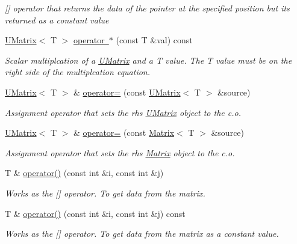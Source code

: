 \begin{DoxyCompactItemize}
\begin{DoxyCompactList}\small\item\em \mbox{[}\mbox{]} operator that returns the data of the pointer at the specified position but its returned as a constant value \end{DoxyCompactList}\item 
\mbox{\hyperlink{class_u_matrix}{U\+Matrix}}$<$ T $>$ \mbox{\hyperlink{class_u_matrix_a7b1875cfc49b374875dac2a58948f3ac}{operator $\ast$}} (const T \&val) const
\begin{DoxyCompactList}\small\item\em Scalar multiplcation of a \mbox{\hyperlink{class_u_matrix}{U\+Matrix}} and a T value. The T value must be on the right side of the multiplcation equation. \end{DoxyCompactList}\item 
\mbox{\hyperlink{class_u_matrix}{U\+Matrix}}$<$ T $>$ \& \mbox{\hyperlink{class_u_matrix_a3f12f4544a460dd93dac8a883654310f}{operator=}} (const \mbox{\hyperlink{class_u_matrix}{U\+Matrix}}$<$ T $>$ \&source)
\begin{DoxyCompactList}\small\item\em Assignment operator that sets the rhs \mbox{\hyperlink{class_u_matrix}{U\+Matrix}} object to the c.\+o. \end{DoxyCompactList}\item 
\mbox{\hyperlink{class_u_matrix}{U\+Matrix}}$<$ T $>$ \& \mbox{\hyperlink{class_u_matrix_a98d77665ae6c6dd8c264d7aca57d76fd}{operator=}} (const \mbox{\hyperlink{class_matrix}{Matrix}}$<$ T $>$ \&source)
\begin{DoxyCompactList}\small\item\em Assignment operator that sets the rhs \mbox{\hyperlink{class_matrix}{Matrix}} object to the c.\+o. \end{DoxyCompactList}\item 
T \& \mbox{\hyperlink{class_u_matrix_a06c554ab9d6deb7d1950cdd49eb089e0}{operator()}} (const int \&i, const int \&j)
\begin{DoxyCompactList}\small\item\em Works as the \mbox{[}\mbox{]} operator. To get data from the matrix. \end{DoxyCompactList}\item 
T \& \mbox{\hyperlink{class_u_matrix_a2fbb6915ab1a6bb7a8944b51600b6d2d}{operator()}} (const int \&i, const int \&j) const
\begin{DoxyCompactList}\small\item\em Works as the \mbox{[}\mbox{]} operator. To get data from the matrix as a constant value. \end{DoxyCompactList}\end{DoxyCompactItemize}


